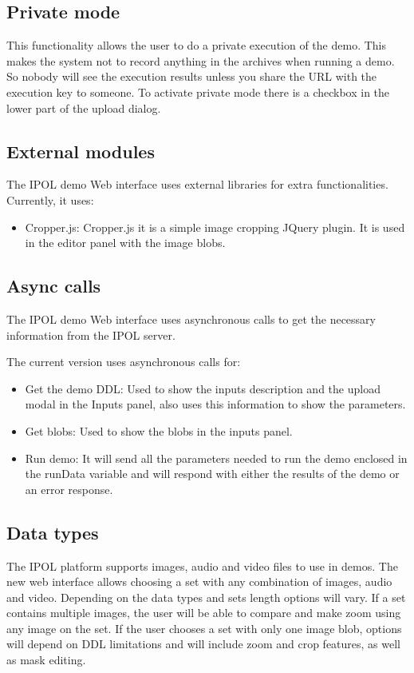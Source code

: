 \subsection{Private mode}
This functionality allows the user to do a private execution of the demo. This makes the system not to record anything in the archives when running 
a demo. So nobody will see the execution results unless you share the URL with the execution key to someone. To activate private 
mode there is a checkbox in the lower part of the upload dialog.

\subsection{External modules}

The IPOL demo Web interface uses external libraries for extra functionalities.
Currently, it uses:

\begin{itemize}
\item Cropper.js: Cropper.js it is a simple image cropping JQuery plugin. It is used in the editor panel with the image blobs.
\end{itemize}


\subsection{Async calls}
The IPOL demo Web interface uses asynchronous calls to get the necessary information from the IPOL server.

The current version uses asynchronous calls for:
\begin{itemize}
\item Get the demo DDL: Used to show the inputs description and the upload modal in the Inputs panel, also uses this information to show the parameters.
\item Get blobs: Used to show the blobs in the inputs panel.
\item Run demo: It will send all the parameters needed to run the demo enclosed in the runData variable and will respond with either the results of 
the demo or an error response.
\end{itemize}


\subsection{Data types}
The IPOL platform supports images, audio and video files to use in demos. The new web interface 
allows choosing a set with any combination of images, audio and video. Depending on the data types and sets length options will vary. 
If a set contains multiple images, the user will be able to compare and make zoom using any image on the set. If the user chooses a set with only 
one image blob, options will depend on DDL limitations and will include zoom and crop features, as well as mask editing.

